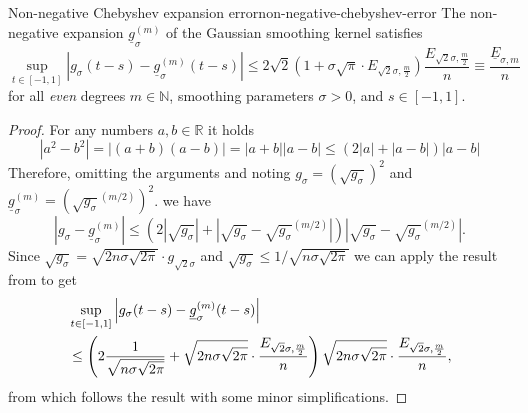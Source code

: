 \documentclass[12pt]{article}
\begin{document}
\begin{lemma}{Non-negative Chebyshev expansion error}{non-negative-chebyshev-error}
    The non-negative expansion $\underline{g}_{\sigma}^{(m)}$ of the Gaussian smoothing kernel satisfies
    \begin{equation}
        \sup_{t \in [-1, 1]} \left| g_{\sigma}(t - s) - \underline{g}_{\sigma}^{(m)}(t - s) \right| \leq 2\sqrt{2} \left(1 + \sigma \sqrt{\pi} \cdot E_{\sqrt{2}\sigma, \frac{m}{2}}\right) \frac{E_{\sqrt{2}\sigma, \frac{m}{2}}}{n} \equiv \frac{\underline{E}_{\sigma, m}}{n}
        \label{equ:2-chebyshev-interpolation-sup-error-kernel}
    \end{equation}
    for all \emph{even} degrees $m \in \mathbb{N}$, smoothing parameters $\sigma > 0$, and $s \in [-1, 1]$.
\end{lemma}

\begin{proof}
    For any numbers $a, b \in \mathbb{R}$ it holds
    \begin{equation}
    | a^2 - b^2 | = | (a + b)(a - b) | = | a + b | | a - b | \leq (2 | a | + | a - b |)  | a - b |
    \end{equation}
    Therefore, omitting the arguments and noting $g_{\sigma} = (\sqrt{g_{\sigma}})^2$ and $\underline{g}_{\sigma}^{(m)} = (\sqrt{g_{\sigma}}^{(m/2)})^2$.
    we have
    \begin{equation}
        \left| g_{\sigma} - \underline{g}_{\sigma}^{(m)} \right| \leq \left( 2 \left| \sqrt{g_{\sigma}} \right| + \left| \sqrt{g_{\sigma}} - \sqrt{g_{\sigma}}^{(m/2)} \right| \right) \left| \sqrt{g_{\sigma}} - \sqrt{g_{\sigma}}^{(m/2)} \right|.
    \end{equation}
    Since $\sqrt{g_{\sigma}} = \sqrt{2 n \sigma \sqrt{2 \pi}} \cdot g_{\sqrt{2}\sigma}$ and $\sqrt{g_{\sigma}} \leq 1/\sqrt{n \sigma \sqrt{2 \pi}}$ we can apply the result from  to get
    \begin{align}
        &\sup_{t \in [-1, 1]} \left| g_{\sigma}(t - s) - \underline{g}_{\sigma}^{(m)}(t - s) \right| \notag \\
        &\leq \left( 2 \frac{1}{\sqrt{n \sigma \sqrt{2\pi}}} + \sqrt{2 n \sigma \sqrt{2 \pi}} \cdot \frac{E_{\sqrt{2}\sigma, \frac{m}{2}}}{n}\right)\sqrt{2 n \sigma \sqrt{2 \pi}} \cdot \frac{E_{\sqrt{2}\sigma, \frac{m}{2}}}{n},
    \end{align}
    from which follows the result with some minor simplifications.
\end{proof}
\end{document}
